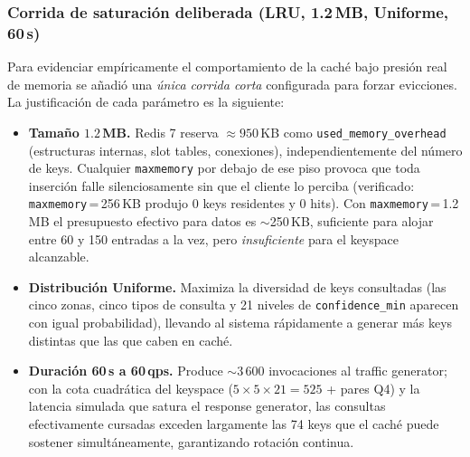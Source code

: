 \documentclass[11pt,a4paper]{article}
\begin{document}
\subsubsection*{Corrida de saturación deliberada (LRU, 1.2\,MB, Uniforme, 60\,s)}

Para evidenciar empíricamente el comportamiento de la caché bajo presión
real de memoria se añadió una \emph{única corrida corta} configurada para
forzar evicciones. La justificación de cada parámetro es la siguiente:

\begin{itemize}[leftmargin=*,itemsep=2pt]
\item \textbf{Tamaño $\mathbf{1.2}$\,MB.} Redis 7 reserva $\approx 950$\,KB
  como \texttt{used\_memory\_overhead} (estructuras internas, slot tables,
  conexiones), independientemente del número de keys. Cualquier
  \texttt{maxmemory} por debajo de ese piso provoca que toda inserción
  falle silenciosamente sin que el cliente lo perciba (verificado:
  \texttt{maxmemory}\,=\,256\,KB produjo 0 keys residentes y 0 hits). Con
  \texttt{maxmemory}\,=\,1.2\,MB el presupuesto efectivo para datos es
  $\sim$250\,KB, suficiente para alojar entre 60 y 150 entradas a la vez,
  pero \emph{insuficiente} para el keyspace alcanzable.
\item \textbf{Distribución Uniforme.} Maximiza la diversidad de keys
  consultadas (las cinco zonas, cinco tipos de consulta y 21 niveles de
  \texttt{confidence\_min} aparecen con igual probabilidad), llevando al
  sistema rápidamente a generar más keys distintas que las que caben en
  caché.
\item \textbf{Duración 60\,s a 60\,qps.} Produce $\sim$3\,600 invocaciones
  al traffic generator; con la cota cuadrática del keyspace
  ($5 \times 5 \times 21 = 525$ + pares Q4) y la latencia simulada que
  satura el response generator, las consultas efectivamente cursadas
  exceden largamente las 74 keys que el caché puede sostener
  simultáneamente, garantizando rotación continua.
\end{itemize}
\end{document}
